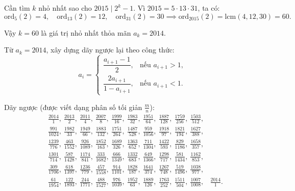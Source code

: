 \begin{problem}
\begin{soln}
    Cần tìm \( k \) nhỏ nhất sao cho \( 2015 \mid 2^k - 1 \). Vì \( 2015 = 5 \cdot 13 \cdot 31 \), ta có:
    \[
        \text{ord}_{5}(2) = 4, \quad \text{ord}_{13}(2) = 12, \quad \text{ord}_{31}(2) = 30 \implies \text{ord}_{2015}(2) = \text{lcm}(4, 12, 30) = 60.
    \]

    Vậy \( k = 60 \) là giá trị nhỏ nhất thỏa mãn \( a_k = 2014 \).
\end{soln}

\newpage

\begin{soln}
    Từ \( a_k = 2014 \), xây dựng dãy ngược lại theo công thức:
    \[
        a_i = 
        \begin{cases}
            \dfrac{a_{i+1} - 1}{2}, &\text{nếu } a_{i+1} > 1, \\
            \dfrac{2a_{i+1}}{1 - a_{i+1}}, &\text{nếu } a_{i+1} < 1.
        \end{cases}
    \]

    Dãy ngược (được viết dạng phân số tối giản \( \frac{m}{n} \)):
    \[
        \begin{aligned}
            &\frac{2014}{1},\ \frac{2013}{2},\ \frac{2011}{4},\ \frac{2007}{8},\ \frac{1999}{16},\ \frac{1983}{32},\ \frac{1951}{64},\ \frac{1887}{128},\ \frac{1759}{256},\ \frac{1503}{512},\\
            &\frac{991}{1024},\ \frac{1982}{33},\ \frac{1949}{66},\ \frac{1883}{132},\ \frac{1751}{264},\ \frac{1487}{528},\ \frac{959}{1056},\ \frac{1918}{97},\ \frac{1821}{194},\ \frac{1627}{388},\\
            &\frac{1239}{776},\ \frac{463}{1552},\ \frac{926}{1089},\ \frac{1852}{163},\ \frac{1689}{326},\ \frac{1363}{652},\ \frac{711}{1304},\ \frac{1422}{593},\ \frac{829}{1186},\ \frac{1658}{357},\\
            &\frac{1301}{714},\ \frac{587}{1428},\ \frac{1174}{841},\ \frac{333}{1682},\ \frac{666}{1349},\ \frac{1332}{683},\ \frac{649}{1366},\ \frac{1298}{717},\ \frac{581}{1434},\ \frac{1162}{853},\\
            &\frac{309}{1706},\ \frac{618}{1397},\ \frac{1236}{779},\ \frac{457}{1558},\ \frac{914}{1101},\ \frac{1828}{187},\ \frac{1641}{374},\ \frac{1267}{748},\ \frac{519}{1496},\ \frac{1038}{977},\\
            &\frac{61}{1954},\ \frac{122}{1893},\ \frac{244}{1771},\ \frac{488}{1527},\ \frac{976}{1039},\ \frac{1952}{63},\ \frac{1889}{126},\ \frac{1763}{252},\ \frac{1511}{504},\ \frac{1007}{1008},
            &\frac{2014}{1}.
        \end{aligned}
    \]


\end{soln}
\end{problem}

